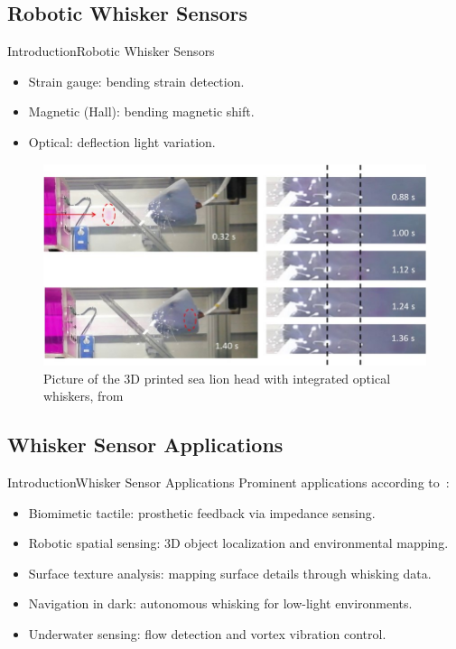 \documentclass[AIRbeamer
,optEnglish
,optBiber
,optBibstyleAlphabetic
,optBeamerClassicFormat%
]{AIRlatex}
\begin{document}
    \subsection{Robotic Whisker Sensors}
    \begin{frame}{Introduction}{Robotic Whisker Sensors}
        \begin{itemize}
            \item Strain gauge: bending \to strain detection.
            \item Magnetic (Hall): bending \to magnetic shift.
            \item Optical: deflection \to light variation.
        \end{itemize}
        \begin{figure}[H]
            \centering
            \includegraphics[height=0.5\textheight]{figures/optical-whisker}
            \caption{Picture of the 3D printed sea lion head with integrated optical whiskers, from \cite{optical-whisker}}
        \end{figure}
    \end{frame}

    \subsection{Whisker Sensor Applications}
    \begin{frame}{Introduction}{Whisker Sensor Applications}
        Prominent applications according to~\cite{s22072705}:
        \begin{itemize}
            \item Biomimetic tactile: prosthetic feedback via impedance sensing.
            \item Robotic spatial sensing: 3D object localization and environmental mapping.
            \item Surface texture analysis: mapping surface details through whisking data.
            \item Navigation in dark: autonomous whisking for low-light environments.
            \item Underwater sensing: flow detection and vortex vibration control.
        \end{itemize}
    \end{frame}
\end{document}
